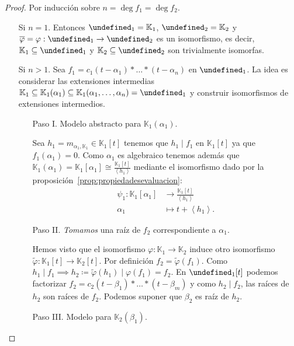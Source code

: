 \documentclass[10pt, spanish]{report}
\theoremstyle{definition}
\theoremstyle{custom}
\theoremstyle{remark}
\newcommand{\K}{\mathbb{K}}
\let\L\undefined
\newcommand{\L}{\mathbb{L}}
\begin{document}
\begin{proof}
    Por inducción sobre $n=\deg{f_1}=\deg{f_2}$.
    \begin{itemize}[itemindent=30pt]
        \item[Si $n=1$.] Entonces $\L_1=\K_1$, $\L_2=\K_2$ y
            $\overline{\varphi}=\varphi:\L_1\to\L_2$ es un isomorfismo, es
            decir, $\K_1\subseteq\L_1$ y $\K_2\subseteq\L_2$ son trivialmente
            isomorfas.
        \item[Si $n>1$.] Sea $f_1=c_1(t-\alpha_1)*\ldots*(t-\alpha_n)$ en
            $\L_1$. La idea es considerar las extensiones intermedias
            $\K_1\subseteq\K_1(\alpha_1)\subseteq\K_1(\alpha_1,\ldots,\alpha_n)=\L_1$
            y construir isomorfismos de extensiones intermedios.
            \begin{enumerate}[itemindent=24pt]
                \item[Paso I.] Modelo abstracto para $\K_1(\alpha_1)$.

                    Sea $h_1=m_{\alpha_1,\K_1}\in\K_1[t]$ tenemos que
                    $h_1\mid f_1$ en $\K_1[t]$ ya que $f_1(\alpha_1)=0$.
                    Como $\alpha_1$ es algebraico tenemos además que
                    $\K_1(\alpha_1)=\K_1[\alpha_1]\cong
                    \frac{\K_1[t]}{\left<h_1\right>}$ mediante el isomorfismo
                    dado por la proposición~\ref{prop:propiedadesevaluacion}:
                    \begin{align*}
                        \psi_1: \K_1[\alpha_1]&\to \frac{\K_1[t]}{\left< h_1
                        \right>}\\
                            \alpha_1&\mapsto t+\left<h_1\right>.
                    \end{align*}
                \item[Paso II.] \textit{Tomamos} una raíz de $f_2$
                    correspondiente a $\alpha_1$.

                    Hemos visto que el isomorfismo $\varphi:\K_1\to \K_2$ induce
                    otro isomorfismo $\tilde{\varphi}:\K_1[t]\to\K_2[t]$. Por
                    definición $f_2=\tilde{\varphi}(f_1)$. Como $h_1\mid
                    f_1\implies
                    h_2\coloneqq\tilde{\varphi}(h_1)\mid\varphi(f_1)=f_2$. En
                    $\L_1[t]$ podemos factorizar
                    $f_2=c_2(t-\beta_1)*\ldots*(t-\beta_m)$ y como $h_2\mid
                    f_2$, las raíces de $h_2$ son raíces de $f_2$. Podemos
                    suponer que $\beta_2$ es raíz de $h_2$.
                \item[Paso III.] Modelo para $\K_2(\beta_1)$.


\end{enumerate}
\end{itemize}
\end{proof}
\end{document}
